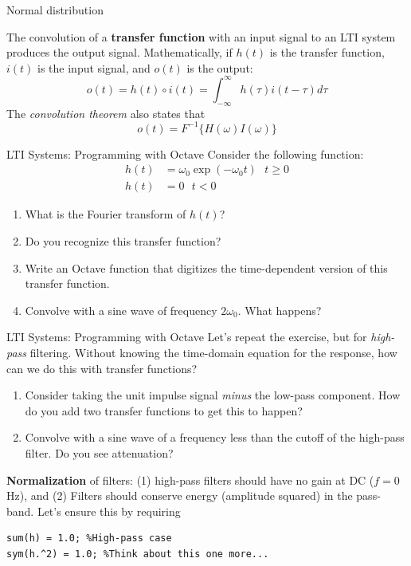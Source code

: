 \documentclass{beamer}
\begin{document}
\begin{frame}{Normal distribution}
\begin{tcolorbox}[colback=white,colframe=red!40!blue,title=Transfer Function]
\alert{The convolution of a \textbf{transfer function} with an input signal to an LTI system produces the output signal.  Mathematically, if $h(t)$ is the transfer function, $i(t)$ is the input signal, and $o(t)$ is the output:
\begin{equation}
o(t) = h(t) \circ i(t) = \int_{-\infty}^{\infty} h(\tau) i(t-\tau) d\tau
\end{equation}
The \textit{convolution theorem} also states that
\begin{equation}
o(t) = F^{-1} \lbrace H(\omega) I(\omega) \rbrace
\end{equation}
}
\end{tcolorbox}
\end{frame}

\begin{frame}[fragile]{LTI Systems: Programming with Octave}
\small
Consider the following function:
\begin{align}
h(t) &= \omega_0 \exp(-\omega_0 t) ~~~ t\geq 0 \\
h(t) &= 0 ~~~ t<0
\end{align}
\begin{enumerate}
\item What is the Fourier transform of $h(t)$?
\item Do you recognize this transfer function?
\item Write an Octave function that digitizes the time-dependent version of this transfer function.
\item Convolve with a sine wave of frequency $2\omega_0$.  What happens?
\end{enumerate}
\end{frame}

\begin{frame}[fragile]{LTI Systems: Programming with Octave}
\small
Let's repeat the exercise, but for \textit{high-pass} filtering.  Without knowing the time-domain equation for the response, how can we do this with transfer functions?
\begin{enumerate}
\item Consider taking the unit impulse signal \textit{minus} the low-pass component.  How do you add two transfer functions to get this to happen?
\item Convolve with a sine wave of a frequency less than the cutoff of the high-pass filter.  Do you see attenuation?
\end{enumerate}
\textbf{Normalization} of filters: (1) high-pass filters should have no gain at DC ($f=0$ Hz), and (2) Filters should conserve energy (amplitude squared) in the pass-band.  Let's ensure this by requiring
\begin{verbatim}
sum(h) = 1.0; %High-pass case
sym(h.^2) = 1.0; %Think about this one more...
\end{verbatim}
\end{frame}
\end{document}
